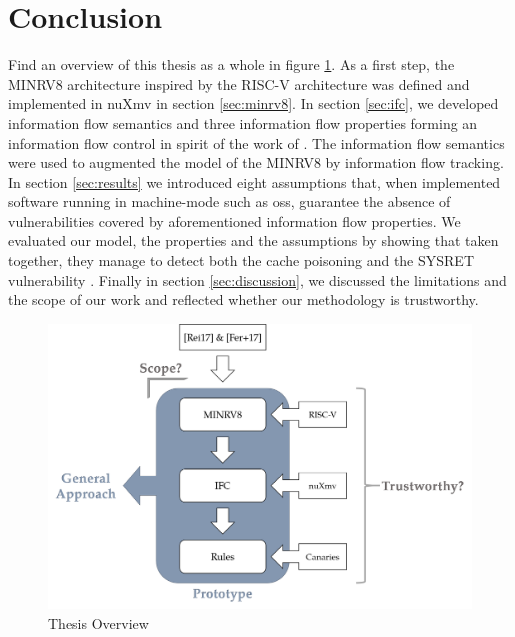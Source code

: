 
\section{Conclusion}
\label{sec:conclusion}

Find an overview of this thesis as a whole in figure \ref{fig:overview}.
As a first step, the MINRV8 architecture inspired by the RISC-V architecture was defined and implemented in nuXmv in section \ref{sec:minrv8}.
In section \ref{sec:ifc}, we developed information flow semantics and three information flow properties forming an information flow control in spirit of the work of \citeauthor{Ferraiuolo17} \cite{Ferraiuolo17}.
The information flow semantics were used to augmented the model of the MINRV8 by information flow tracking.
In section \ref{sec:results} we introduced eight assumptions that, when implemented software running in machine-mode such as \glspl{os}, guarantee the absence of vulnerabilities covered by aforementioned information flow properties.
We evaluated our model, the properties and the assumptions by showing that taken together, they manage to detect both the cache poisoning \cite{Wojtczuk09} and the SYSRET vulnerability \cite{Dunlap19}.
Finally in section \ref{sec:discussion}, we discussed the limitations and the scope of our work and reflected whether our methodology is trustworthy.

\begin{figure}
    \centering
    \includegraphics[width=\textwidth]{figures/thesis-overview.png}
    \caption{Thesis Overview}
    \label{fig:overview}
\end{figure}

